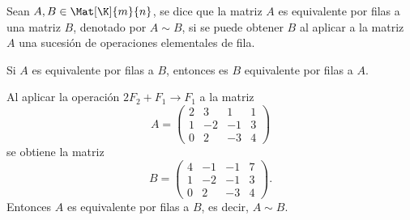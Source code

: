 \documentclass[compacto,10pt]{pubciencias-notas}
\begin{document}
\begin{defi}
    Sean $A,B\in \Mat[\K]{m}{n}$, se dice que la matriz $A$ es equivalente por filas a una matriz $B$, denotado por $A\sim B$, si se puede obtener $B$ al aplicar a la matriz $A$ una sucesión de operaciones elementales de fila.
\end{defi}

\begin{advertencia}
Si $A$ es equivalente por filas a $B$, entonces es $B$ equivalente por filas a $A$.
\end{advertencia}

\begin{ejem}\hspace{0pt} Al aplicar la operación $2F_2+F_1\rightarrow F_1$ a la matriz
\[
    A=\begin{pmatrix}
        2&3&1&1\\
        1&-2&-1&3\\
        0&2&-3&4
    \end{pmatrix}
\]
se obtiene la matriz
\[
    B=\begin{pmatrix}
        4&-1&-1&7\\
        1&-2&-1&3\\
        0&2&-3&4
    \end{pmatrix}.
\]
Entonces $A$ es equivalente por filas a $B$, es decir, $A\sim B$. 
\end{ejem}

\end{document}
